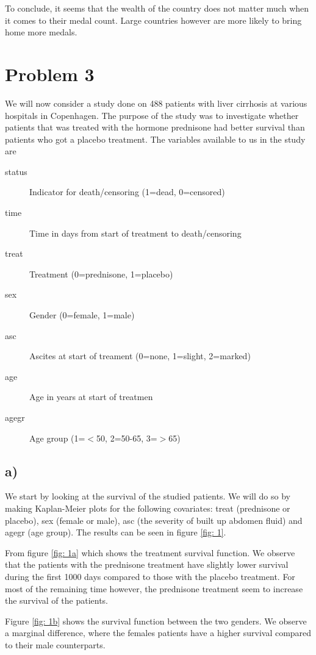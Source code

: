 \documentclass[a4paper, 10pt, reqno]{amsart}
\begin{document}
To conclude, it seems that the wealth of the country does not matter much when it comes to their medal count. Large countries however are more likely to bring home more medals.

\section{Problem 3}
We will now consider a study done on 488 patients with liver cirrhosis at various hospitals in Copenhagen. The purpose of the study was to investigate whether patients that was treated with the hormone prednisone had better survival than patients who got a placebo treatment. The variables available to us in the study are

\begin{description}
    \item[status] Indicator for death/censoring (1=dead, 0=censored)
    \item[time] Time in days from start of treatment to death/censoring
    \item[treat] Treatment (0=prednisone, 1=placebo)
    \item[sex] Gender (0=female, 1=male)
    \item[asc] Ascites at start of treament (0=none, 1=slight, 2=marked)
    \item[age] Age in years at start of treatmen
    \item[agegr] Age group (1=$<$50, 2=50-65, 3=$>$65)
\end{description}

\subsection{a)}
We start by looking at the survival of the studied patients. We will do so by making Kaplan-Meier plots for the following covariates: treat (prednisone or placebo), sex (female or male), asc (the severity of built up abdomen fluid) and agegr (age group). The results can be seen in figure \ref{fig: 1}. 

From figure \ref{fig: 1a} which shows the treatment survival function. We observe that the patients with the prednisone treatment have slightly lower survival during the first 1000 days compared to those with the placebo treatment. For most of the remaining time however, the prednisone treatment seem to increase the survival of the patients.

Figure \ref{fig: 1b} shows the survival function between the two genders. We observe a marginal difference, where the females patients have a higher survival compared to their male counterparts.
\end{document}
